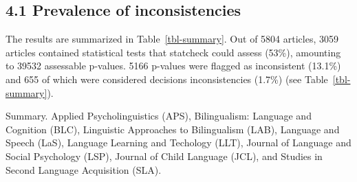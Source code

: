 \documentclass[
  doc,
  longtable,
  nolmodern,
  notxfonts,
  notimes,
  colorlinks=true,linkcolor=blue,citecolor=blue,urlcolor=blue]{apa7}
\begin{document}
\subsection{4.1 Prevalence of
inconsistencies}\label{prevalence-of-inconsistencies}

The results are summarized in Table~\ref{tbl-summary}. Out of 5804
articles, 3059 articles contained statistical tests that statcheck could
assess (53\%), amounting to 39532 assessable p-values. 5166 p-values
were flagged as inconsistent (13.1\%) and 655 of which were considered
decisions inconsistencies (1.7\%) (see Table~\ref{tbl-summary}).

\begin{table}

{\caption{{Summary. Applied Psycholinguistics (APS), Bilingualism:
Language and Cognition (BLC), Linguistic Approaches to Bilingualism
(LAB), Language and Speech (LaS), Language Learning and Techology (LLT),
Journal of Language and Social Psychology (LSP), Journal of Child
Language (JCL), and Studies in Second Language Acquisition
(SLA).}{\label{tbl-summary}}}}


\end{table}
\end{document}
